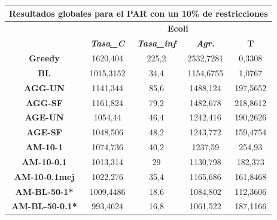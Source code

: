 \documentclass[12pt, spanish]{article}
\begin{document}
\begin{table}[H]
\centering
\begin{tabular}{|c|c|c|c|c|}
\hline
\multicolumn{5}{|c|}{\textbf{Resultados globales para el PAR con un 10\% de restricciones}}                                 \\ \hline
\multirow{2}{*}{}           & \multicolumn{4}{c|}{\textbf{Ecoli}}                                                           \\ \cline{2-5} 
                            & \textit{\textbf{Tasa\_C}} & \textit{\textbf{Tasa\_inf}} & \textit{\textbf{Agr.}} & \textbf{T} \\ \hline
\textbf{Greedy}             & 1620,404                  & 225,2                       & 2532,7281              & 0,3308     \\ \hline
\textbf{BL}                 & 1015,3152                 & 34,4                        & 1154,6755              & 1,0767     \\ \hline
\textbf{AGG-UN}             & 1141,344                  & 85,6                        & 1488,124               & 197,5652   \\ \hline
\textbf{AGG-SF}             & 1161,824                  & 79,2                        & 1482,678               & 218,8612   \\ \hline
\textbf{AGE-UN}             & 1054,44                   & 46,4                        & 1242,416               & 190,2626   \\ \hline
\textbf{AGE-SF}             & 1048,506                  & 48,2                        & 1243,772               & 159,4754   \\ \hline
\textbf{AM-10-1}            & 1074,736                  & 40,2                        & 1237,59                & 254,93     \\ \hline
\textbf{AM-10-0.1}          & 1013,314                  & 29                          & 1130,798               & 182,373    \\ \hline
\textbf{AM-10-0.1mej}       & 1022,276                  & 35,4                        & 1165,686               & 161,8468   \\ \hline
\textbf{AM-BL-50-1*}        & 1009,4486                 & 18,6                        & 1084,802               & 112,3606   \\ \hline
\textbf{AM-BL-50-0.1*}      & 993,4624                  & 16,8                        & 1061,522               & 187,1166   \\ \hline

\end{tabular}
\end{table}
\end{document}
